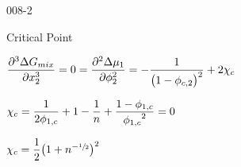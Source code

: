 \begin{mitframe}{008-2}
\begin{listone}
    \item Critical Point
    
    \begin{listtwo}
    
    	\item $\dfrac{\partial^3\iipf\gibbs_{mix}}{\partial\specfrac{2}^3} = 0 = \dfrac{\partial^2\iipf\chempot_{1}}{\partial\fhmolefrac{2}^2} = -\dfrac{1}{\big(1-\fhmolefrac{\crit,2}\big)^2}+2\fhparam_{\crit}$ \\
    
    	\item $\fhparam_{\crit} = \dfrac{1}{2\fhmolefrac{1,\crit}}+1-\dfrac{1}{n}+\dfrac{1-\fhmolefrac{1,\crit}}{{\fhmolefrac{1,\crit}}^2} = 0$ \\
    
    	\item $\fhparam_{\crit} = \dfrac{1}{2}\big(1+n^{-\sfrac{1}{2}}\big)^2$
    
    \end{listtwo}
    
\end{listone}
    
\end{mitframe}